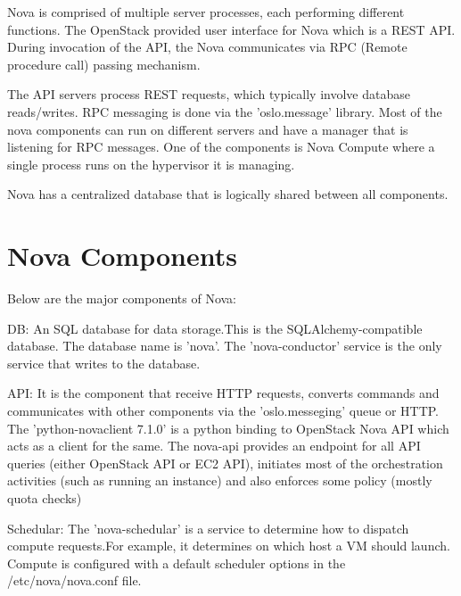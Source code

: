 \documentclass[9pt,twocolumn,twoside]{../../styles/osajnl}
\begin{document}
Nova is comprised of multiple server processes, each performing different functions. The OpenStack provided user interface for Nova which is a REST API. During invocation of the API, the Nova communicates via  RPC (Remote procedure call) passing mechanism.

The API servers process REST requests, which typically involve database reads/writes. RPC messaging is done via the 'oslo.message' library. Most of the nova components can run on different servers and have a manager that is listening for RPC messages. One of the components is Nova Compute where a single process runs on the hypervisor it is managing.

Nova has a centralized database that is logically  shared between all components\cite{www-nova-pepple}.


\section{Nova Components}

Below are the major components of Nova:


\begin{flushleft}


DB: An SQL database for data storage.This is the SQLAlchemy-compatible database. The database name is 'nova'. The 'nova-conductor' service is the only service that writes to the database. 
\end{flushleft}

\begin{flushleft}
\item API: It is the component that receive HTTP requests, converts commands and communicates with other components via the 'oslo.messeging' queue or HTTP.
The 'python-novaclient 7.1.0' is a python binding to OpenStack Nova API which acts as a client for the same. The nova-api provides an endpoint for all API queries (either OpenStack API or EC2 API), initiates most of the orchestration activities (such as running an instance) and also enforces some policy (mostly quota checks)
\end{flushleft}

\begin{flushleft}

Schedular: The 'nova-schedular' is a service to determine how to dispatch compute requests.For example, it determines on which host a VM should launch. Compute is configured with a default scheduler options in the /etc/nova/nova.conf file\cite{www-nova-schedular}.
\end{flushleft}
\end{document}
